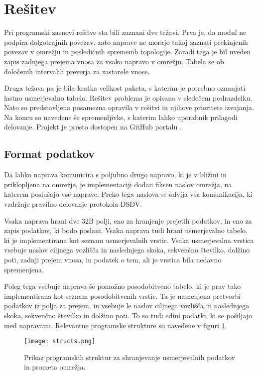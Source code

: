 \section{Rešitev}
Pri programski zasnovi rešitve sta bili zaznani dve težavi. Prva je, da modul ne podpira dolgotrajnih povezav, zato naprave ne morajo takoj zaznati prekinjenih povezav v omrežju in posledičnih sprememb topologije. Zaradi tega je bil uveden zapis zadnjega prejema vnosa za vsako napravo v omrežju. Tabela se ob določenih intervalih preverja za zastarele vnose.

Druga težava pa je bila kratka velikost paketa, s katerim je potrebno oznanjati lastno usmerjevalno tabelo. Rešitev problema je opisana v sledečem podrazdelku. Nato so predstavljena posamezna opravila v rešitvi in njihove prioritete izvajanja. Na koncu so navedene še spremenljivke, s katerim lahko uporabnik prilagodi delovanje. Projekt je prosto dostopen na GitHub portalu \cite{impl}.

\subsection{Format podatkov}
Da lahko naprava komunicira s poljubno drugo napravo, ki je v bližini in priklopljena na omrežje, je implementaciji dodan fiksen naslov omrežja, na katerem poslušajo vse naprave. Preko tega naslova se odvija vsa komunikacija, ki vzdržuje pravilno delovanje protokola DSDV.

Vsaka naprava hrani dve 32B polji, eno za hranjenje prejetih podatkov, in eno za zapis podatkov, ki bodo poslani. Vsaka naprava tudi hrani usmerjevalno tabelo, ki je implementirana kot seznam usmerjevalnih vrstic. Vsaka usmerjevalna vrstica vsebuje naslov ciljnega vozlišča in naslednjega skoka, sekvenčno številko, dolžino poti, zadnji prejem vnosa, in podatek o tem, ali je vrstica bila nedavno spremenjena.

Poleg tega vsebuje naprava še pomožno posodobitveno tabelo, ki je prav tako implementirana kot seznam posodobitvenih vrstic. Ta je namenjena pretvorbi podatkov iz polja za prejem, in vsebuje le naslov ciljnega vozlišča in naslednjega skoka, sekvenčno številko in dolžino poti. To so tudi edini podatki, ki se pošiljajo med napravami. Relevantne programske strukture so navedene v figuri \ref{g04:structs}.

\begin{figure}[t]
\sidecaption[t]
\texttt{[image: structs.png]}
\caption{Prikaz programskih struktur za shranjevanje usmerjevalnih podatkov in prometa omrežja.}
\label{g04:structs}
\end{figure}

